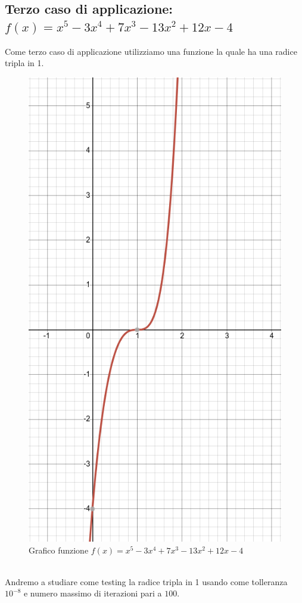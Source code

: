 \documentclass[12pt, letterpaper]{article}
\begin{document}
\newpage

\subsection{Terzo caso di applicazione: $f(x)=x^5-3x^4+7x^3-13x^2+12x-4$}
Come terzo caso di applicazione utilizziamo una funzione la quale ha una radice tripla in 1.
\begin{figure}[ht!]
    \centering
    \includegraphics[scale=0.5]{MultiRadix.png}
    \caption{Grafico funzione $f(x)=x^5-3x^4+7x^3-13x^2+12x-4$}
\end{figure} \\
Andremo a studiare come testing la radice tripla in 1 usando come tolleranza $10^{-8}$ e numero massimo di iterazioni pari a $100$.
\newpage
\end{document}
